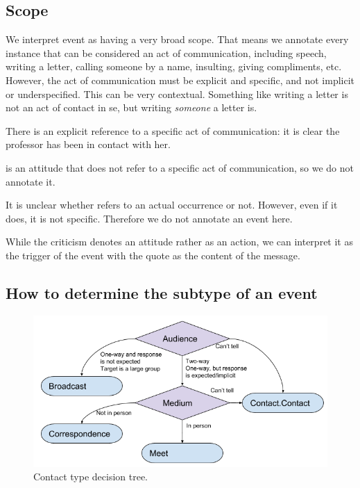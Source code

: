 \subsection{Scope}

We interpret  event as having a very broad scope. That means we annotate every instance that can be considered an act of communication, including speech, writing a letter, calling someone by a name, insulting, giving compliments, etc. However, the act of communication must be explicit and specific, and not implicit or underspecified. This can be very contextual. Something like writing a letter is not an act of contact in se, but writing \emph{someone} a letter is.

\begin{exe}
    \ex {}
        \expl There is an explicit reference to a specific act of communication: it is clear the professor has been in contact with her.
        
    \ex {}
        \expl {} is an attitude that does not refer to a specific act of communication, so we do not annotate it.
        
    \ex {}
        \expl It is unclear whether  refers to an actual occurrence or not. However, even if it does, it is not specific. Therefore we do not annotate an event here.
        
    \ex {}
        \expl While the criticism denotes an attitude rather as an action, we can interpret it as the trigger of the  event with the quote as the content of the message.
\end{exe}



\subsection{How to determine the  subtype of an event}

\begin{figure}[t]
\centering
\includegraphics[width=\textwidth]{img/contact_decision_tree.png}
\caption{Contact type decision tree.}
\label{fig:contact_decision_tree}
\end{figure}

